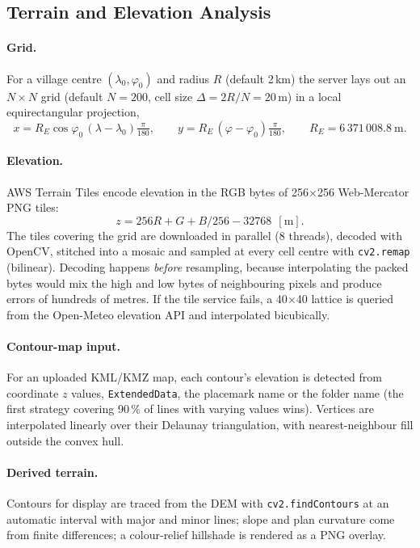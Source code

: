 \documentclass[manuscript,screen,review]{acmart}
\newcommand{\code}[1]{\texttt{\small #1}}
\begin{document}
\subsection{Terrain and Elevation Analysis}
\paragraph{Grid.} For a village centre $(\lambda_0,\varphi_0)$ and radius $R$ (default 2\,km)
the server lays out an $N\times N$ grid (default $N=200$, cell size $\Delta=2R/N=20$\,m) in a
local equirectangular projection,
\begin{equation}
x = R_E\cos\varphi_0\,(\lambda-\lambda_0)\tfrac{\pi}{180},\qquad
y = R_E\,(\varphi-\varphi_0)\tfrac{\pi}{180},\qquad R_E = 6\,371\,008.8\ \text{m}.
\end{equation}

\paragraph{Elevation.} AWS Terrain Tiles encode elevation in the RGB bytes of 256$\times$256
Web-Mercator PNG tiles:
\begin{equation}
z = 256R + G + B/256 - 32768\ \ [\text{m}].
\end{equation}
The tiles covering the grid are downloaded in parallel (8 threads), decoded with OpenCV,
stitched into a mosaic and sampled at every cell centre with \code{cv2.remap} (bilinear).
Decoding happens \emph{before} resampling, because interpolating the packed bytes would mix
the high and low bytes of neighbouring pixels and produce errors of hundreds of metres. If the
tile service fails, a 40$\times$40 lattice is queried from the Open-Meteo elevation API and
interpolated bicubically.

\paragraph{Contour-map input.} For an uploaded KML/KMZ map, each contour's elevation is
detected from coordinate $z$ values, \code{ExtendedData}, the placemark name or the folder name
(the first strategy covering 90\,\% of lines with varying values wins). Vertices are
interpolated linearly over their Delaunay triangulation, with nearest-neighbour fill outside
the convex hull.

\paragraph{Derived terrain.} Contours for display are traced from the DEM with
\code{cv2.findContours} at an automatic interval with major and minor lines; slope and plan
curvature come from finite differences; a colour-relief hillshade is rendered as a PNG overlay.
\end{document}
